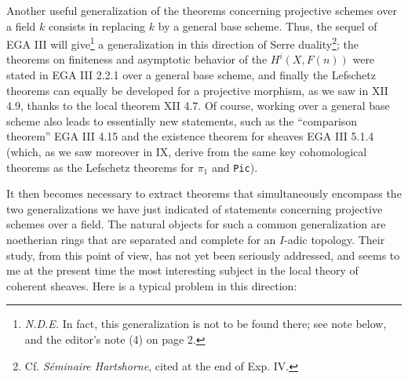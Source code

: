 \documentclass[
]{article}
\begin{document}
Another useful generalization of the theorems concerning projective
schemes over a field \(k\) consists in replacing \(k\) by a general base
scheme. Thus, the sequel of EGA III will give\footnote{\emph{N.D.E.} In
  fact, this generalization is not to be found there; see note below,
  and the editor's note (4) on page 2.} a generalization in this
direction of Serre duality\footnote{Cf. \emph{Séminaire Hartshorne},
  cited at the end of Exp. IV.}; the theorems on finiteness and
asymptotic behavior of the \(H^{i}(X, F(n))\) were stated in EGA III
2.2.1 over a general base scheme, and finally the Lefschetz theorems can
equally be developed for a projective morphism, as we saw in XII 4.9,
thanks to the local theorem XII 4.7. Of course, working over a general
base scheme also leads to essentially new statements, such as the
``comparison theorem'' EGA III 4.15 and the existence theorem for
sheaves EGA III 5.1.4 (which, as we saw moreover in IX, derive from the
same key cohomological theorems as the Lefschetz theorems for
\(\pi_{1}\) and \texttt{Pic}).

It then becomes necessary to extract theorems that simultaneously
encompass the two generalizations we have just indicated of statements
concerning projective schemes over a field. The natural objects for such
a common generalization are noetherian rings that are separated and
complete for an \(I\)-adic topology. Their study, from this point of
view, has not yet been seriously addressed, and seems to me at the
present time the most interesting subject in the local theory of
coherent sheaves. Here is a typical problem in this direction:
\end{document}

